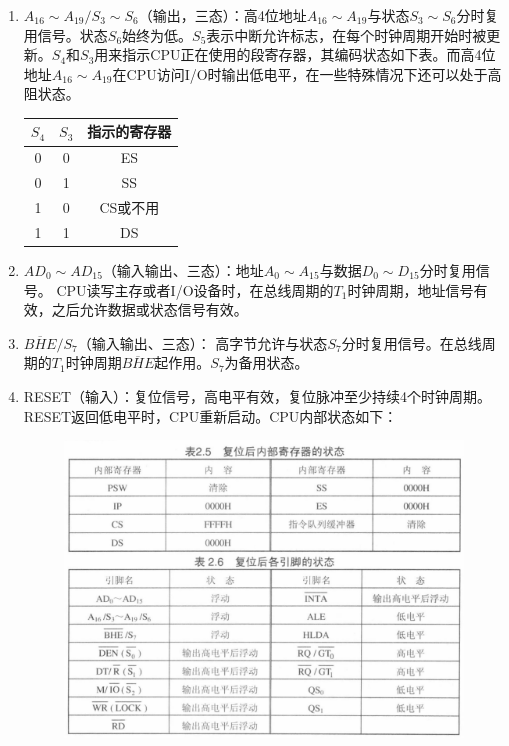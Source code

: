 \documentclass{article}
\begin{document}
\begin{enumerate}
    \item  $A_{16}\sim A_{19}/S_3\sim S_6$（输出，三态）：高4位地址$A_{16}\sim A_{19}$与状态$S_3\sim S_6$分时复用信号。状态$S_6$始终为低。$S_5$表示中断允许标志，在每个时钟周期开始时被更新。$S_4$和$S_3$用来指示CPU正在使用的段寄存器，其编码状态如下表。而高4位地址$A_{16}\sim A_{19}$在CPU访问I/O时输出低电平，在一些特殊情况下还可以处于高阻状态。
\begin{table}[H]
    \centering
    \begin{tabular}[]{ccc}
        \hline
        $S_4$ & $S_3$ & 指示的寄存器 \\
        \hline
        0 & 0 & ES\\
        0 & 1 & SS\\
        1 & 0 & CS或不用\\
        1 & 1 & DS \\
        \hline
    \end{tabular}
\end{table}

\item  $AD_0 \sim  AD_{15}$（输入输出、三态）：地址$A_0 \sim A_{15}$与数据$D_0 \sim D_{15}$分时复用信号。 CPU读写主存或者I/O设备时，在总线周期的$T_1$时钟周期，地址信号有效，之后允许数据或状态信号有效。

\item  $\overline{BHE}/S_7$（输入输出、三态）： 高字节允许与状态$S_7$分时复用信号。在总线周期的$T_1$时钟周期$\overline{BHE}$起作用。$S_7$为备用状态。

\item  RESET（输入）：复位信号，高电平有效，复位脉冲至少持续4个时钟周期。RESET返回低电平时，CPU重新启动。CPU内部状态如下：

\begin{figure}[H]
    \centering
    \includegraphics[width=12cm]{img/2.2-4.png}
\end{figure}


\end{enumerate}
\end{document}

